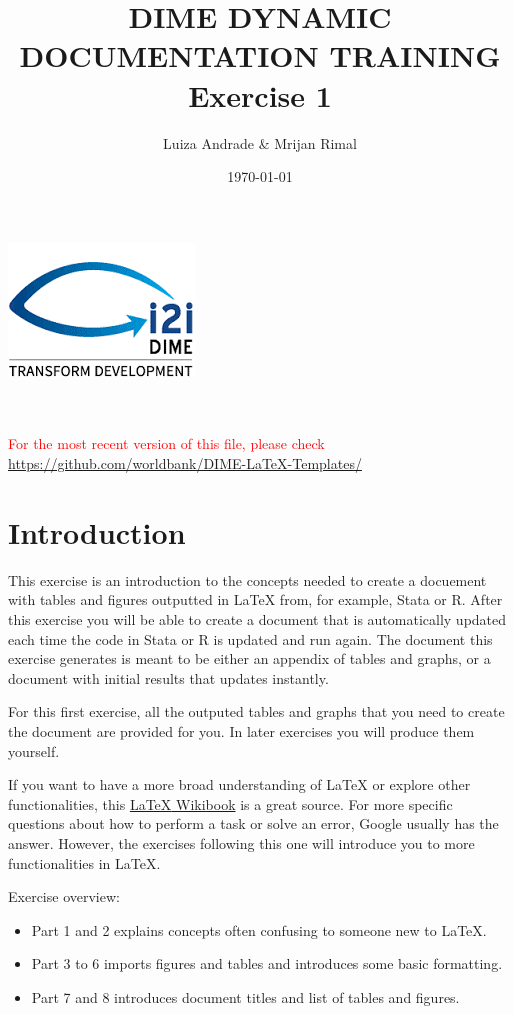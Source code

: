 \documentclass[12pts]{article}
\title{DIME DYNAMIC DOCUMENTATION TRAINING \\ Exercise 1}
\author{Luiza Andrade \& Mrijan Rimal}
\date{\today}
\begin{document}
	
	
	\makeatletter
	\begin{titlepage}
		\begin{center}
			\includegraphics[width=0.3\linewidth]{../img/i2i.png}\\[10ex]
			{\LARGE \bfseries  \@title }\\[2ex] 
			{\Large  \@author}\\[20ex] 
			{\large \@date}
		\end{center}
		\vspace{5cm}
		\textcolor{red}{For the most recent version of this file, please check \url{https://github.com/worldbank/DIME-LaTeX-Templates/}}
	\end{titlepage}
	\makeatother
	
	\tableofcontents
	
	\newpage
	\section*{Introduction}
	This exercise is an introduction to the concepts needed to create a docuement with tables and figures outputted in {\LaTeX} from, for example, Stata or R. After this exercise you will be able to create a document that is automatically updated each time the code in Stata or R is updated and run again. The document this exercise generates is meant to be either an appendix of tables and graphs, or a document with initial results that updates instantly.
	
	For this first exercise, all the outputed tables and graphs that you need to create the document are provided for you. In later exercises you will produce them yourself.
	
	If you want to have a more broad understanding of {\LaTeX} or explore other functionalities, this \href{https://en.wikibooks.org/wiki/LaTeX
	}{{\LaTeX} Wikibook} is a great source. For more specific questions about how to perform a task or solve an error, Google usually has the answer. However, the exercises following this one will introduce you to more functionalities in {\LaTeX}.
	
	Exercise overview:
	\begin{itemize}
		\item Part 1 and 2 explains concepts often confusing to someone new to {\LaTeX}.
		\item Part 3 to 6 imports figures and tables and introduces some basic formatting.
		\item Part 7 and 8 introduces document titles and list of tables and figures.
	\end{itemize}
	
\end{document}
